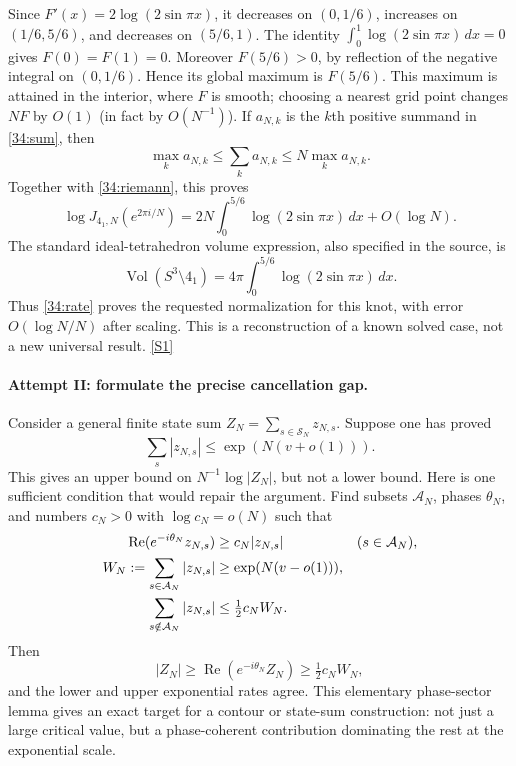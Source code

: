 \documentclass[11pt,a4paper]{article}
\newcommand{\sref}[2]{\hyperlink{source:#1:#2}{[S#2]}}
\numberwithin{equation}{section}
\begin{document}
Since $F'(x)=2\log(2\sin\pi x)$, it decreases on $(0,1/6)$,
increases on $(1/6,5/6)$, and decreases on $(5/6,1)$.
The identity $\int_0^1\log(2\sin\pi x)\,dx=0$ gives
$F(0)=F(1)=0$.  Moreover $F(5/6)>0$, by reflection of the negative
integral on $(0,1/6)$.  Hence its global maximum is $F(5/6)$.
This maximum is attained in the interior, where $F$ is smooth; choosing
a nearest grid point changes $NF$ by $O(1)$ (in fact by $O(N^{-1})$).
If $a_{N,k}$ is the $k$th positive summand in \eqref{34:sum}, then
\[
 \max_k a_{N,k}\leq\sum_k a_{N,k}\leq N\max_k a_{N,k}.
\]
Together with \eqref{34:riemann}, this proves
\begin{equation}\label{34:rate}
 \log J_{4_1,N}(e^{2\pi i/N})
 =2N\int_0^{5/6}\log(2\sin\pi x)\,dx+O(\log N).
\end{equation}
The standard ideal-tetrahedron volume expression, also specified in the
source, is
\[
 \operatorname{Vol}(S^3\setminus4_1)
 =4\pi\int_0^{5/6}\log(2\sin\pi x)\,dx.
\]
Thus \eqref{34:rate} proves the requested normalization for this knot,
with error $O(\log N/N)$ after scaling.  This is a reconstruction of a
known solved case, not a new universal result. \sref{34}{1}

\paragraph{Attempt II: formulate the precise cancellation gap.}
Consider a general finite state sum $Z_N=\sum_{s\in\mathcal S_N}z_{N,s}$.
Suppose one has proved
\[
 \sum_s|z_{N,s}|\leq\exp(N(v+o(1))).
\]
This gives an upper bound on $N^{-1}\log|Z_N|$, but not a lower bound.
Here is one sufficient condition that would repair the argument.  Find
subsets $\mathcal A_N$, phases $\theta_N$, and numbers $c_N>0$ with
$\log c_N=o(N)$ such that
\begin{align}\label{34:phase}
 \operatorname{Re}(e^{-i\theta_N}z_{N,s})&\geq c_N|z_{N,s}|
                 &&(s\in\mathcal A_N),\\
 W_N:=\sum_{s\in\mathcal A_N}|z_{N,s}|&\geq\exp(N(v-o(1))),\notag\\
 \sum_{s\notin\mathcal A_N}|z_{N,s}|&\leq\tfrac12c_NW_N.\notag
\end{align}
Then
\[
 |Z_N|\geq\operatorname{Re}(e^{-i\theta_N}Z_N)
       \geq\tfrac12c_NW_N,
\]
and the lower and upper exponential rates agree.  This elementary
phase-sector lemma gives an exact target for a contour or state-sum
construction: not just a large critical value, but a phase-coherent
contribution dominating the rest at the exponential scale.
\end{document}
